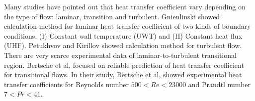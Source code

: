 \documentclass[conference]{IEEEtran}
\begin{document}
Many studies have pointed out that heat transfer coefficient vary depending on the type of flow: laminar, transition and turbulent.
Gnienlinski\cite{Gnienlinski2010} showed calculation method for laminar heat transfer coefficient of two kinds of boundary conditions. (I) Constant wall temperature (UWT) and (I\hspace{-.1em}I) Constant heat flux (UHF).
Petukhvov and Kirillov\cite{Petukhov1958} showed calculation method for turbulent flow.
There are very scarce experimental data of laminar-to-turbulent transitional region.
Bertsche et al,\cite{Bertsche2016} focused on reliable prediction of heat transfer coefficient for transitional flows.
In their study, Bertsche et al, showed experimental heat transfer coefficients for Reynolds number $500 < Re < 23000$ and Prandtl number $7 < Pr < 41$.
\end{document}

